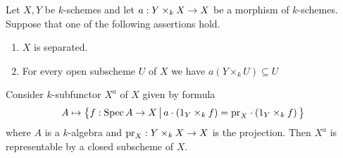 \begin{lemma}\label{lemma:representability_of_fixed_point_functor}
Let $X,Y$ be $k$-schemes and let $a:Y\times_kX\rightarrow X$ be a morphism of $k$-schemes. Suppose that one of the following assertions hold.
\begin{enumerate}[label=\emph{\textbf{(\arabic*)}}, leftmargin=3.0em]
\item $X$ is separated.
\item For every open subscheme $U$ of $X$ we have $a\left(Y\times_kU\right)\subseteq U$
\end{enumerate}
Consider $k$-subfunctor $X^a$ of $X$ given by formula
$$A \mapsto \big\{f:\mathrm{Spec}\, A\rightarrow X\,\big|\,a\cdot \left(1_Y \times_k f\right) = \mathrm{pr}_X\cdot \left(1_Y \times_kf\right)\big\}$$
where $A$ is a  $k$-algebra and $\mathrm{pr}_X:Y\times_kX \rightarrow X$ is the projection. Then $X^a$ is representable by a closed subscheme of $X$.
\end{lemma}
